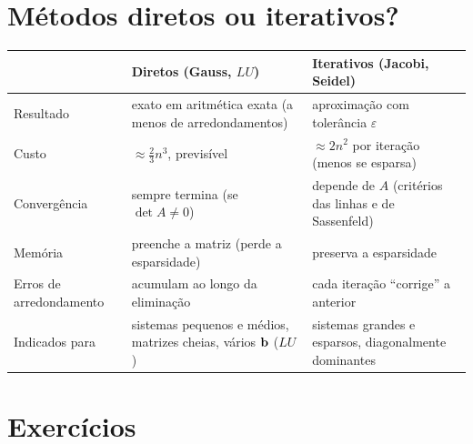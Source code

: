 \section{Métodos diretos ou iterativos?}

\begin{center}
\begin{tabular}{>{\raggedright\arraybackslash}p{4.2cm}>{\raggedright\arraybackslash}p{5.2cm}>{\raggedright\arraybackslash}p{5.2cm}}
\toprule
 & Diretos (Gauss, $LU$) & Iterativos (Jacobi, Seidel)\\
\midrule
Resultado & exato em aritmética exata (a menos de arredondamentos) & aproximação com tolerância $\varepsilon$\\
Custo & $\approx\frac23n^3$, previsível & $\approx2n^2$ por iteração (menos se esparsa)\\
Convergência & sempre termina (se $\det A\neq0$) & depende de $A$ (critérios das linhas e de Sassenfeld)\\
Memória & preenche a matriz (perde a esparsidade) & preserva a esparsidade\\
Erros de arredondamento & acumulam ao longo da eliminação & cada iteração ``corrige'' a anterior\\
Indicados para & sistemas pequenos e médios, matrizes cheias, vários $\mathbf{b}$ ($LU$) & sistemas grandes e esparsos, diagonalmente dominantes\\
\bottomrule
\end{tabular}
\end{center}

\section{Exercícios}

